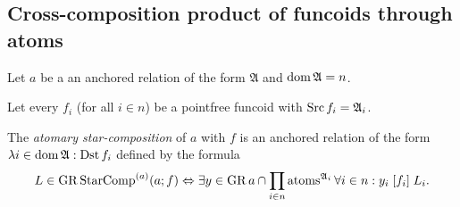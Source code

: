 \subsection{Cross-composition product of funcoids through atoms}

Let $a$ be a an anchored relation of the form $\mathfrak{A}$ and
$\operatorname{dom}\mathfrak{A}=n$.

Let every $f_{i}$ (for all $i\in n$) be a pointfree funcoid with
$\operatorname{Src} f_{i}=\mathfrak{A}_{i}$.

The \emph{atomary star-composition} of $a$ with $f$ is an anchored relation of
the form $\lambda i\in\operatorname{dom}\mathfrak{A}:\operatorname{Dst} f_{i}$ defined by the
formula 
\[
L\in\operatorname{GR}\operatorname{StarComp}^{(a)}(a;f)\Leftrightarrow\exists y\in\operatorname{GR} a\cap\prod_{i\in n}\operatorname{atoms}^{\mathfrak{A}_{i}}\forall i\in n:y_{i}\mathrel{\left[f_{i}\right]}L_{i}.
\]

